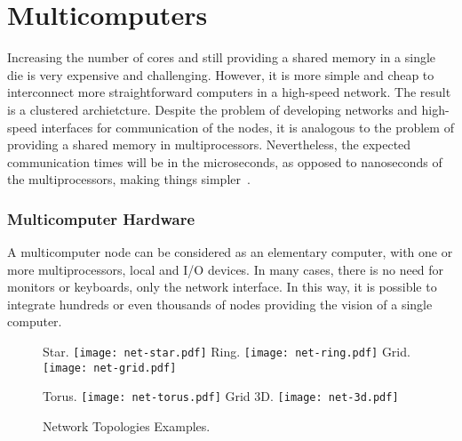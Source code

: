 	\section{Multicomputers}
	\label{sec.multicomputers}

		Increasing the number of cores and still providing a shared memory in a
		single die is very expensive and challenging.
		However, it is more simple and cheap to interconnect more straightforward
		computers in a high-speed network. The result is a clustered archietcture.
		Despite the problem of developing networks and high-speed interfaces
		for communication of the nodes, it is analogous to the problem of
		providing a shared memory in multiprocessors.
		Nevertheless, the expected communication times will be in the
		microseconds, as opposed to nanoseconds of the multiprocessors,
		making things simpler~\cite{tanenbaum:4ed}.

			\subsubsection{Multicomputer Hardware}
			\label{sec.multicomputers-hw}

				A multicomputer node can be considered as an elementary computer, with one or
				more multiprocessors, local \ram and I/O devices.
				In many cases, there is no need for monitors or keyboards, only the
				network interface.
				In this way, it is possible to integrate hundreds or even thousands
				of nodes providing the vision of a single computer.

				\begin{figure}[!tb]
					\centering%
					\caption{Network Topologies Examples.}%
					\label{fig:net-topologies}%

						{Star.}%
						{\texttt{[image: net-star.pdf]}}%
					\hspace{1cm}%
						{Ring.}%
						{\texttt{[image: net-ring.pdf]}}%
					\hspace{1cm}%
						{Grid.}%
						{\texttt{[image: net-grid.pdf]}}%

						{Torus.}%
						{\texttt{[image: net-torus.pdf]}}%
					\hspace{1cm}%
						{Grid 3D.}%
						{\texttt{[image: net-3d.pdf]}}%

				\end{figure}

